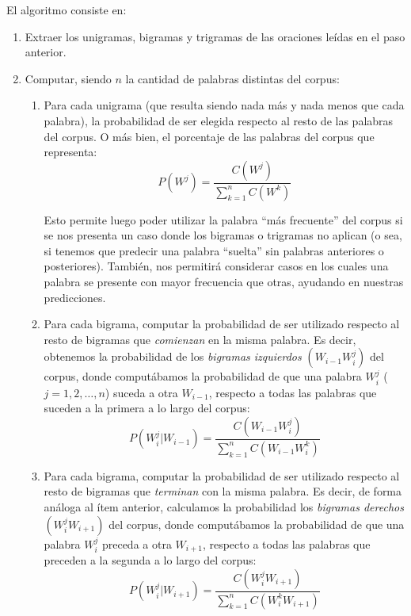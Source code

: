 \documentclass[a4paper]{article}
\begin{document}
\noindent El algoritmo consiste en:

\begin{enumerate}
    \item Extraer los unigramas, bigramas y trigramas de las oraciones leídas en el paso anterior.
    \item Computar, siendo $n$ la cantidad de palabras distintas del corpus:
        \begin{enumerate}
            \item Para cada unigrama (que resulta siendo nada más y nada menos que cada palabra), la probabilidad de ser elegida respecto al resto de las palabras del corpus. O más bien, el porcentaje de las palabras del corpus que representa:
            \[
                P(W^j) = \frac{C(W^j)}{\sum_{k=1}^n C(W^k)}
            \]

            Esto permite luego poder utilizar la palabra ``más frecuente'' del corpus si se nos presenta un caso donde los bigramas o trigramas no aplican (o sea, si tenemos que predecir una palabra ``suelta'' sin palabras anteriores o posteriores). También, nos permitirá considerar casos en los cuales una palabra se presente con mayor frecuencia que otras, ayudando en nuestras predicciones.

        \item Para cada bigrama, computar la probabilidad de ser utilizado respecto al resto de bigramas que \textit{comienzan} en la misma palabra. Es decir, obtenemos la probabilidad de los \textit{bigramas izquierdos} $(W_{i-1} W_i^j)$ del corpus, donde computábamos la probabilidad de que una palabra $W_i^j$ ($j = 1,2,\dots,n$) suceda a otra $W_{i-1}$, respecto a todas las palabras que suceden a la primera a lo largo del corpus:
            \[
                P(W_i^j|W_{i-1}) = \frac{C(W_{i-1} W_i^j)}{\sum_{k=1}^n C(W_{i-1} W_i^k)}
            \]

        \item Para cada bigrama, computar la probabilidad de ser utilizado respecto al resto de bigramas que \textit{terminan} con la misma palabra. Es decir, de forma análoga al ítem anterior, calculamos la probabilidad los \textit{bigramas derechos} $(W_i^j W_{i+1})$ del corpus, donde computábamos la probabilidad de que una palabra $W_i^j$ preceda a otra $W_{i+1}$, respecto a todas las palabras que preceden a la segunda a lo largo del corpus:
            \[
               P(W_i^j|W_{i+1}) = \frac{C(W_i^j W_{i+1})}{\sum_{k=1}^n C(W_i^k W_{i+1})}
            \]
        

\end{enumerate}
\end{enumerate}
\end{document}
